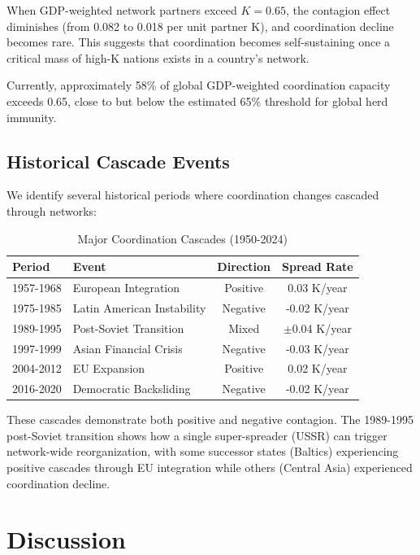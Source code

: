 \documentclass[12pt,a4paper]{article}
\begin{document}
When GDP-weighted network partners exceed $K = 0.65$, the contagion effect diminishes (from 0.082 to 0.018 per unit partner K), and coordination decline becomes rare. This suggests that coordination becomes self-sustaining once a critical mass of high-K nations exists in a country's network.

Currently, approximately 58\% of global GDP-weighted coordination capacity exceeds 0.65, close to but below the estimated 65\% threshold for global herd immunity.

\subsection{Historical Cascade Events}

We identify several historical periods where coordination changes cascaded through networks:

\begin{table}[H]
\centering
\caption{Major Coordination Cascades (1950-2024)}
\label{tab:cascades}
\begin{tabular}{llcc}
\toprule
\textbf{Period} & \textbf{Event} & \textbf{Direction} & \textbf{Spread Rate} \\
\midrule
1957-1968 & European Integration & Positive & 0.03 K/year \\
1975-1985 & Latin American Instability & Negative & -0.02 K/year \\
1989-1995 & Post-Soviet Transition & Mixed & $\pm$0.04 K/year \\
1997-1999 & Asian Financial Crisis & Negative & -0.03 K/year \\
2004-2012 & EU Expansion & Positive & 0.02 K/year \\
2016-2020 & Democratic Backsliding & Negative & -0.02 K/year \\
\bottomrule
\end{tabular}
\end{table}

These cascades demonstrate both positive and negative contagion. The 1989-1995 post-Soviet transition shows how a single super-spreader (USSR) can trigger network-wide reorganization, with some successor states (Baltics) experiencing positive cascades through EU integration while others (Central Asia) experienced coordination decline.

\section{Discussion}
\label{sec:discussion}
\end{document}
